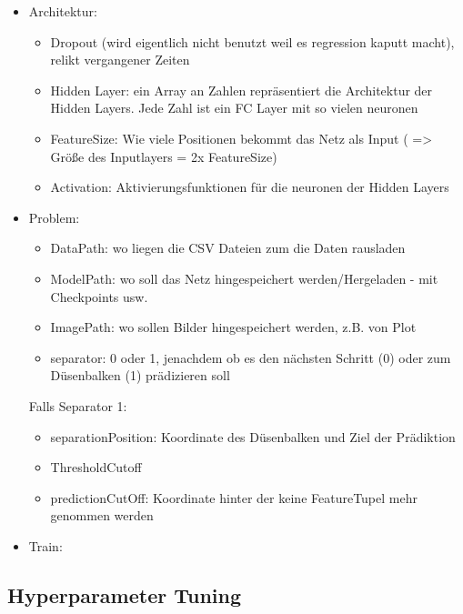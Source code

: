 
\begin{itemize}
\item Architektur:
    \begin{itemize}
        \item Dropout (wird eigentlich nicht benutzt weil es regression kaputt macht), relikt vergangener Zeiten
        \item Hidden Layer: ein Array an Zahlen repräsentiert die Architektur der Hidden Layers. Jede Zahl ist ein FC Layer mit so vielen neuronen
        \item FeatureSize: Wie viele Positionen bekommt das Netz als Input ( => Größe des Inputlayers = 2x FeatureSize)
        \item Activation: Aktivierungsfunktionen für die neuronen der Hidden Layers
    \end{itemize}
\item Problem:
    \begin{itemize}
        \item DataPath: wo liegen die CSV Dateien zum die Daten rausladen
        \item ModelPath: wo soll das Netz hingespeichert werden/Hergeladen - mit Checkpoints usw.
        \item ImagePath: wo sollen Bilder hingespeichert werden, z.B. von Plot
        \item separator: 0 oder 1, jenachdem ob es den nächsten Schritt (0) oder zum Düsenbalken (1) prädizieren soll
    \end{itemize}

    Falls Separator 1:
    \begin{itemize}
        \item separationPosition: Koordinate des Düsenbalken und Ziel der Prädiktion
        \item ThresholdCutoff 
        \item predictionCutOff: Koordinate hinter der keine FeatureTupel mehr genommen werden
    \end{itemize}
\item Train:

\end{itemize}


\subsection{Hyperparameter Tuning}

